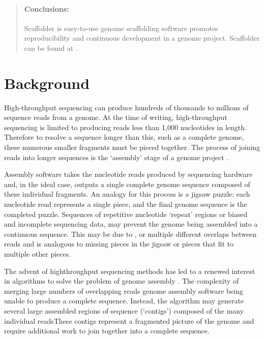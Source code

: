 \documentclass[10pt]{bmc_article}
\newenvironment{bmcformat}{\begin{raggedright}\baselineskip20pt\sloppy\setboolean{publ}{false}}{\end{raggedright}\baselineskip20pt\sloppy}
\begin{document}
\begin{bmcformat}
\begin{abstract}
  \paragraph*{Conclusions:} Scaffolder is easy-to-use genome scaffolding
  software promotes reproducibility and continuous
  development in a genome project. Scaffolder can be found at \scaffolder.

\end{abstract}


\clearpage

\section*{Background} %

High-throughput sequencing can produce hundreds of thousands to millions of
sequence reads from a genome. At the time of writing, high-throughput
sequencing is limited to producing reads less than 1,000 nucleotides in length.
Therefore to resolve a sequence longer than this, such as a complete genome,
these numerous smaller fragments must be pieced together. The process of
joining reads into longer sequences is the `assembly' stage of a genome project
\cite{miller2010}. \pb

Assembly software takes the nucleotide reads produced by sequencing hardware
and, in the ideal case, outputs a single complete genome sequence composed of
these individual fragments. An analogy for this process is a jigsaw puzzle:
each nucleotide read represents a single piece, and the final genome sequence
is the completed puzzle. Sequences of repetitive nucleotide `repeat' regions
or biased and incomplete sequencing data, may
prevent the genome being assembled into a continuous sequence. This may be due
to , or multiple different overlaps between
reads and is analogous to missing pieces in the jigsaw or pieces that fit to
multiple other pieces. \pb

The advent of high\add{-}throughput sequencing methods has led to a renewed
interest in algorithms to solve the problem of genome assembly
\cite{pop2008,pop2009}. The complexity of merging
large numbers of overlapping reads  genome assembly software
 being unable to produce a complete sequence. Instead, the
algorithm may generate several large assembled regions of sequence (`contigs')
composed of the many individual readsThese contigs
represent a fragmented picture of the genome and  require
additional work to join together into a complete sequence. \pb


\end{bmcformat}
\end{document}

